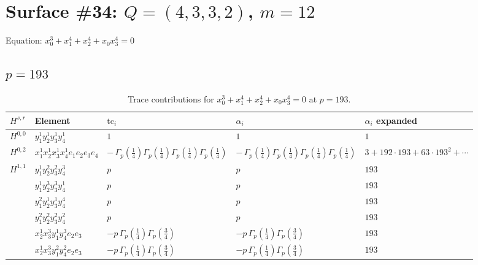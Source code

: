 \documentclass[11pt]{article}
\begin{document}
\newpage

\section*{Surface \#34: $Q=(4, 3, 3, 2)$, $m=12$}

Equation: $x_0^{3} + x_1^{4} + x_2^{4} + x_0 x_3^{4} = 0$

\subsection*{$p = 193$}

\begin{table}[ht]
\centering
\caption{Trace contributions for $x_0^{3} + x_1^{4} + x_2^{4} + x_0 x_3^{4} = 0$ at $p=193$.}\label{tab:deformed-34}
\renewcommand{\arraystretch}{1.1}
{\scriptsize
\begin{tabular}{@{}lllll@{}}
\toprule
$H^{s,r}$ & Element & $\mathrm{tc}_i$ & $\alpha_i$ & $\alpha_i$ expanded \\
\midrule
$H^{0,0}$ & $y_{1}^{1} y_{2}^{1} y_{3}^{1} y_{4}^{1}$ & $1$ & $1$ & $1$ \\
\midrule
$H^{0,2}$ & $x_{1}^{1} x_{2}^{1} x_{3}^{1} x_{4}^{1}  e_{1} e_{2} e_{3} e_{4}$ & $- \, \Gamma_p \left( \frac{1}{4} \right) \Gamma_p \left( \frac{1}{4} \right) \Gamma_p \left( \frac{1}{4} \right) \Gamma_p \left( \frac{1}{4} \right)$ & $- \, \Gamma_p \left( \frac{1}{4} \right) \Gamma_p \left( \frac{1}{4} \right) \Gamma_p \left( \frac{1}{4} \right) \Gamma_p \left( \frac{1}{4} \right)$ & $3{+}192{\cdot}193{+}63{\cdot}193^{2}{+}\cdots$ \\
\midrule
$H^{1,1}$ & $y_{1}^{1} y_{2}^{2} y_{3}^{2} y_{4}^{3}$ & $p \,$ & $p \,$ & $193$ \\
 & $y_{1}^{1} y_{2}^{3} y_{3}^{3} y_{4}^{1}$ & $p \,$ & $p \,$ & $193$ \\
 & $y_{1}^{2} y_{2}^{1} y_{3}^{1} y_{4}^{4}$ & $p \,$ & $p \,$ & $193$ \\
 & $y_{1}^{2} y_{2}^{2} y_{3}^{2} y_{4}^{2}$ & $p \,$ & $p \,$ & $193$ \\
 & $x_{2}^{1} x_{3}^{3} y_{1}^{1} y_{4}^{3} e_{2} e_{3}$ & $- p \, \Gamma_p \left( \frac{1}{4} \right) \Gamma_p \left( \frac{3}{4} \right)$ & $- p \, \Gamma_p \left( \frac{1}{4} \right) \Gamma_p \left( \frac{3}{4} \right)$ & $193$ \\
 & $x_{2}^{1} x_{3}^{3} y_{1}^{2} y_{4}^{2} e_{2} e_{3}$ & $- p \, \Gamma_p \left( \frac{1}{4} \right) \Gamma_p \left( \frac{3}{4} \right)$ & $- p \, \Gamma_p \left( \frac{1}{4} \right) \Gamma_p \left( \frac{3}{4} \right)$ & $193$ \\

\end{tabular}}
\end{table}
\end{document}
